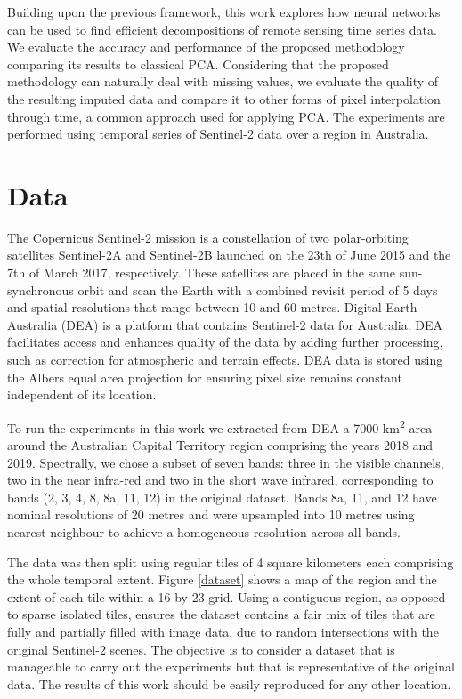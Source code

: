 \documentclass[essd, manuscript]{copernicus}
\begin{document}
Building upon the previous framework, this work explores how neural networks can be used to find efficient decompositions of remote sensing time series data. We evaluate the accuracy and performance of the proposed methodology comparing its results to classical PCA. Considering that the proposed methodology can naturally deal with missing values, we evaluate the quality of the resulting imputed data and compare it to other forms of pixel interpolation through time, a common approach used for applying PCA. The experiments are performed using temporal series of Sentinel-2 data over a region in Australia.


\section{Data}

The Copernicus Sentinel-2 mission \citep{drusch2012sentinel} is a constellation of two polar-orbiting satellites Sentinel-2A and Sentinel-2B launched on the 23th of June 2015 and the 7th of March 2017, respectively. These satellites are placed in the same sun-synchronous orbit and scan the Earth with a combined revisit period of 5 days and spatial resolutions that range between 10 and 60 metres. Digital Earth Australia (DEA) \citep{dhu2017digital} is a platform that contains Sentinel-2 data for Australia. DEA facilitates access and enhances quality of the data by adding further processing, such as correction for atmospheric and terrain effects. DEA data is stored using the Albers equal area projection for ensuring pixel size remains constant independent of its location.

To run the experiments in this work we extracted from DEA a 7000 km\textsuperscript{2} area around the Australian Capital Territory region comprising the years 2018 and 2019. Spectrally, we chose a subset of seven bands: three in the visible channels, two in the near infra-red and two in the short wave infrared, corresponding to bands (2, 3, 4, 8, 8a, 11, 12) in the original dataset. Bands 8a, 11, and 12 have nominal resolutions of 20 metres and were upsampled into 10 metres using nearest neighbour to achieve a homogeneous resolution across all bands.

The data was then split using regular tiles of 4 square kilometers each comprising the whole temporal extent. Figure \ref{dataset} shows a map of the region and the extent of each tile within a 16 by 23 grid. Using a contiguous region, as opposed to sparse isolated tiles, ensures the dataset contains a fair mix of tiles that are fully and partially filled with image data, due to random intersections with the original Sentinel-2 scenes. The objective is to consider a dataset that is manageable to carry out the experiments but that is representative of the original data. The results of this work should be easily reproduced for any other location.
\end{document}
